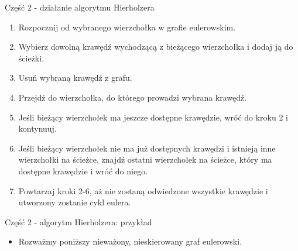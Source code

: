 \documentclass[polish,envcountsect,10pt]{beamer}
\begin{document}
\begin{frame}{Część 2 - działanie algorytmu Hierholzera}
    \begin{enumerate}
        \item Rozpocznij od wybranego wierzchołka w grafie eulerowskim.
        \item Wybierz dowolną krawędź wychodzącą z bieżącego wierzchołka i dodaj ją do ścieżki.
        \item Usuń wybraną krawędź z grafu.
        \item Przejdź do wierzchołka, do którego prowadzi wybrana krawędź.
        \item Jeśli bieżący wierzchołek ma jeszcze dostępne krawędzie, wróć do kroku 2 i kontynuuj.
        \item Jeśli bieżący wierzchołek nie ma już dostępnych krawędzi i istnieją inne wierzchołki na ścieżce, znajdź ostatni wierzchołek na ścieżce, który ma dostępne krawędzie i wróć do niego.
        \item Powtarzaj kroki 2-6, aż nie zostaną odwiedzone wszystkie krawędzie i utworzony zostanie cykl eulera.
    \end{enumerate}
\end{frame}

\begin{frame}{Część 2 - algorytm Hierholzera: przykład}
    \begin{itemize}
        \item Rozważmy poniższy nieważony, nieskierowany graf eulerowski.
    \end{itemize}
    \begin{center}
    \end{center}
\end{frame}
\end{document}
